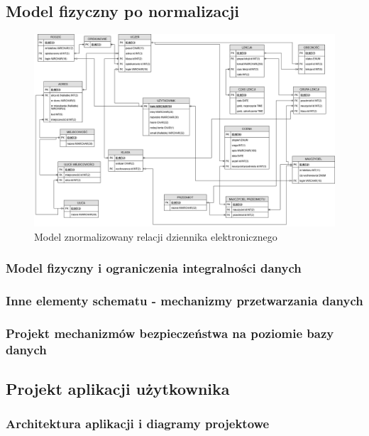 \documentclass[12pt]{article}
\begin{document}
\begin{landscape}
\newpage
\subsection{Model fizyczny po normalizacji}

\begin{figure}[h!]
    \centering
    \includegraphics[scale=0.39]{MZnormalizowany.png}
    \caption{Model znormalizowany relacji dziennika elektronicznego}
    \label{fig:mf}
\end{figure}

\end{landscape}
\clearpage

\subsubsection{Model fizyczny i ograniczenia integralności danych}

\subsubsection{Inne elementy schematu - mechanizmy przetwarzania danych}
\subsubsection{Projekt mechanizmów bezpieczeństwa na poziomie bazy danych}
\subsection{Projekt aplikacji użytkownika}
\subsubsection{Architektura aplikacji i diagramy projektowe}
\end{document}
